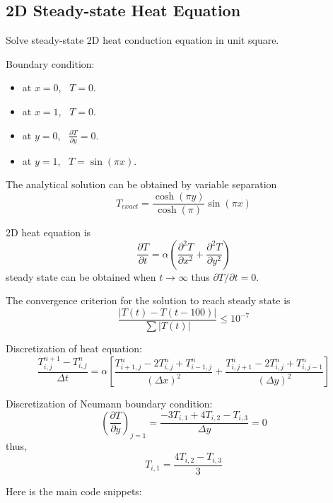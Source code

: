 \documentclass[12pt,a4paper]{article} %
\begin{document}
\begin{CJK}{UTF8}{song}
\newpage
\section{2D Steady-state Heat Equation}
Solve steady-state 2D heat conduction  equation in unit square.

Boundary condition:
\begin{itemize}
  \item at $x=0$, \ $T=0$.
  \item at $x=1$, \ $T=0$.
  \item at $y=0$, \ $\frac{\partial T}{\partial y}=0$.
  \item at $y=1$, \ $T=\sin (\pi x)$.
\end{itemize}

The analytical solution can be obtained by variable separation
\begin{equation}
T_{exact} = \frac{\cosh(\pi y)}{\cosh(\pi)} \sin (\pi x)
\end{equation}

2D heat equation is
\begin{equation}
\frac{\partial T}{\partial t} = \alpha (\frac{\partial^{2} T}{\partial x^{2}}+\frac{\partial^{2} T}{\partial y^{2}})
\end{equation}
steady state can be obtained when $t \rightarrow \infty $ thus  $\partial T / \partial t = 0$.

The convergence criterion for the solution to reach steady state is
\begin{equation}
\frac{|T(t)-T(t-100)|}{\sum |T(t)|} \leq 10^{-7}
\end{equation}

Discretization of heat equation:
\begin{equation}
\frac{T_{i,j}^{n+1}-T_{i,j}^{n}}{\Delta t}=\alpha [ \frac{T_{i+1,j}^{n}-2T_{i,j}^{n}+T_{i-1,j}^{n}}{(\Delta x)^{2}} +\frac{T_{i,j+1}^{n}-2T_{i,j}^{n}+T_{i,j-1}^{n}}{(\Delta y)^{2}} ]
\end{equation}

Discretization of Neumann boundary condition:
\begin{equation}
(\frac{\partial T}{\partial y})_{j=1}=\frac{-3T_{i,1}+4T_{i,2}-T_{i,3}}{\Delta y}=0
\end{equation}
thus,
\begin{equation}
T_{i,1}=\frac{4T_{i,2}-T_{i,3}}{3}
\end{equation}



Here is the main code snippets:



\end{CJK}
\end{document}
